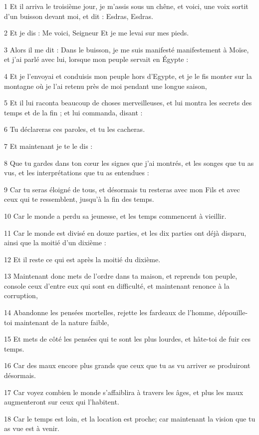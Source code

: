 \par 1 Et il arriva le troisième jour, je m'assis sous un chêne, et voici, une voix sortit d'un buisson devant moi, et dit : Esdras, Esdras.
\par 2 Et je dis : Me voici, Seigneur Et je me levai sur mes pieds.
\par 3 Alors il me dit : Dans le buisson, je me suis manifesté manifestement à Moïse, et j'ai parlé avec lui, lorsque mon peuple servait en Égypte :
\par 4 Et je l'envoyai et conduisis mon peuple hors d'Egypte, et je le fis monter sur la montagne où je l'ai retenu près de moi pendant une longue saison,
\par 5 Et il lui raconta beaucoup de choses merveilleuses, et lui montra les secrets des temps et de la fin ; et lui commanda, disant :
\par 6 Tu déclareras ces paroles, et tu les cacheras.
\par 7 Et maintenant je te le dis :
\par 8 Que tu gardes dans ton cœur les signes que j'ai montrés, et les songes que tu as vus, et les interprétations que tu as entendues :
\par 9 Car tu seras éloigné de tous, et désormais tu resteras avec mon Fils et avec ceux qui te ressemblent, jusqu'à la fin des temps.
\par 10 Car le monde a perdu sa jeunesse, et les temps commencent à vieillir.
\par 11 Car le monde est divisé en douze parties, et les dix parties ont déjà disparu, ainsi que la moitié d'un dixième :
\par 12 Et il reste ce qui est après la moitié du dixième.
\par 13 Maintenant donc mets de l'ordre dans ta maison, et reprends ton peuple, console ceux d'entre eux qui sont en difficulté, et maintenant renonce à la corruption,
\par 14 Abandonne les pensées mortelles, rejette les fardeaux de l'homme, dépouille-toi maintenant de la nature faible,
\par 15 Et mets de côté les pensées qui te sont les plus lourdes, et hâte-toi de fuir ces temps.
\par 16 Car des maux encore plus grands que ceux que tu as vu arriver se produiront désormais.
\par 17 Car voyez combien le monde s'affaiblira à travers les âges, et plus les maux augmenteront sur ceux qui l'habitent.
\par 18 Car le temps est loin, et la location est proche; car maintenant la vision que tu as vue est à venir.
